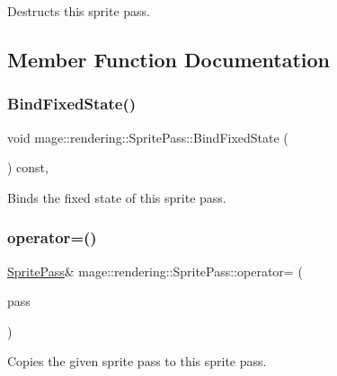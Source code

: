 Destructs this sprite pass. 

\subsection{Member Function Documentation}
\hypertarget{classmage_1_1rendering_1_1_sprite_pass_a76d7ea36f7e24283411dc90686238136}{}\label{classmage_1_1rendering_1_1_sprite_pass_a76d7ea36f7e24283411dc90686238136} 
\subsubsection{\texorpdfstring{Bind\+Fixed\+State()}{BindFixedState()}}
{\footnotesize\ttfamily void mage\+::rendering\+::\+Sprite\+Pass\+::\+Bind\+Fixed\+State (\begin{DoxyParamCaption}{ }\end{DoxyParamCaption}) const\hspace{0.3cm}{\ttfamily [private]}, {\ttfamily [noexcept]}}

Binds the fixed state of this sprite pass. \hypertarget{classmage_1_1rendering_1_1_sprite_pass_a33cd3abf007bafb47d76524096e24eca}{}\label{classmage_1_1rendering_1_1_sprite_pass_a33cd3abf007bafb47d76524096e24eca} 
\subsubsection{\texorpdfstring{operator=()}{operator=()}\hspace{0.1cm}{\footnotesize\ttfamily [1/2]}}
{\footnotesize\ttfamily \hyperlink{classmage_1_1rendering_1_1_sprite_pass}{Sprite\+Pass}\& mage\+::rendering\+::\+Sprite\+Pass\+::operator= (\begin{DoxyParamCaption}\item[{const \hyperlink{classmage_1_1rendering_1_1_sprite_pass}{Sprite\+Pass} \&}]{pass }\end{DoxyParamCaption})\hspace{0.3cm}{\ttfamily [delete]}}

Copies the given sprite pass to this sprite pass.


